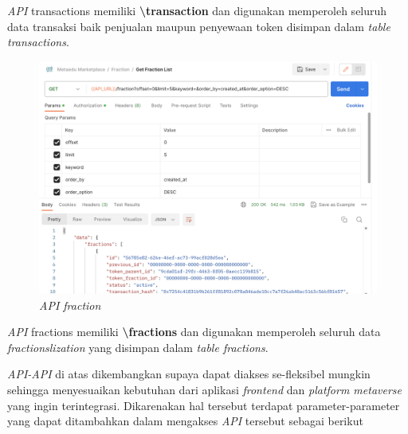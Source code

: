 \emph{API} transactions memiliki \textbf{\textbackslash transaction} dan digunakan memperoleh seluruh data transaksi baik penjualan maupun penyewaan token disimpan dalam \emph{table transactions}. 

\begin{figure} [H] \centering
  \includegraphics[scale=0.3]{gambar/img-api-fractions.png}
  \caption{\emph{API fraction} }
  \label{fig:APIFractions}
\end{figure}

\emph{API} fractions memiliki \textbf{\textbackslash fractions} dan digunakan memperoleh seluruh data \emph{fractionslization} yang disimpan dalam \emph{table fractions}. 

\emph{API-API} di atas dikembangkan supaya dapat diakses se-fleksibel mungkin sehingga menyesuaikan kebutuhan dari aplikasi \emph{frontend} dan \emph{platform metaverse} yang ingin terintegrasi. Dikarenakan hal tersebut terdapat parameter-parameter yang dapat ditambahkan dalam mengakses \emph{API} tersebut sebagai berikut

